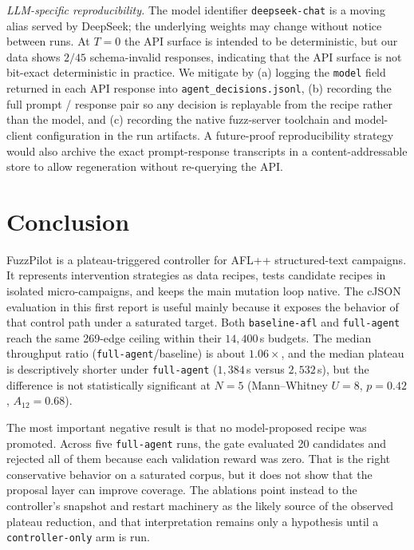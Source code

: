 \documentclass[11pt]{article}
\begin{document}
\emph{LLM-specific reproducibility.} The model identifier
\texttt{deepseek-chat} is a moving alias served by DeepSeek;
the underlying weights may change without notice between runs.
At $T{=}0$ the API surface is intended to be deterministic, but
our data shows $2/45$ schema-invalid responses, indicating that
the API surface is not bit-exact deterministic in practice. We
mitigate by (a) logging the \texttt{model} field returned in each
API response into \texttt{agent\_decisions.jsonl}, (b) recording
the full prompt / response pair so any decision is replayable
from the recipe rather than the model, and (c) recording the native
fuzz-server toolchain and model-client configuration in the run
artifacts. A
future-proof reproducibility strategy would also archive the
exact prompt-response transcripts in a content-addressable store
to allow regeneration without re-querying the API.

\section{Conclusion}
\label{sec:conclusion}

FuzzPilot is a plateau-triggered controller for AFL++ structured-text
campaigns. It represents intervention strategies as data recipes,
tests candidate recipes in isolated micro-campaigns, and keeps the
main mutation loop native. The cJSON evaluation in this first report
is useful mainly because it exposes the behavior of that control path
under a saturated target. Both \texttt{baseline-afl} and
\texttt{full-agent} reach the same 269-edge ceiling within their
$14{,}400$\,s budgets. The median throughput ratio
(\texttt{full-agent}/baseline) is about $1.06\times$, and the median
plateau is descriptively shorter under \texttt{full-agent}
($1{,}384$\,s versus $2{,}532$\,s), but the difference is not
statistically significant at $N{=}5$ (Mann--Whitney $U{=}8$,
$p{=}0.42$, $A_{12}{=}0.68$).

The most important negative result is that no model-proposed recipe
was promoted. Across five \texttt{full-agent} runs, the gate evaluated
20 candidates and rejected all of them because each validation reward
was zero. That is the right conservative behavior on a saturated
corpus, but it does not show that the proposal layer can improve
coverage. The ablations point instead to the controller's snapshot and
restart machinery as the likely source of the observed plateau
reduction, and that interpretation remains only a hypothesis until a
\texttt{controller-only} arm is run.
\end{document}
